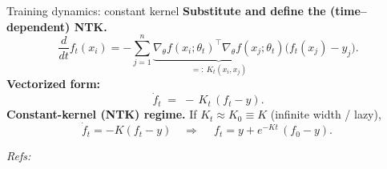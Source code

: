 \documentclass[10pt,aspectratio=169]{beamer}
\begin{document}
\begin{frame}{Training dynamics: constant kernel}
	\textbf{Substitute and define the (time–dependent) NTK.}
	\[
		\frac{d}{dt} f_t(x_i)
		= -\sum_{j=1}^n \underbrace{\nabla_\theta f(x_i;\theta_t)^{\top}\nabla_\theta f(x_j;\theta_t)}_{=:~K_t(x_i,x_j)}
		\big(f_t(x_j)-y_j\big).
	\]
	\pause
	\textbf{Vectorized form:}
	\[
		\boxed{~\dot f_t \;=\; -\,K_t\,(f_t-y).~}
	\]
	\pause
	\textbf{Constant-kernel (NTK) regime.} If $K_t \approx K_0 \equiv K$ (infinite width / lazy),
	\[
		\dot f_t = -K(f_t-y)
		\quad\Rightarrow\quad
		\boxed{~f_t = y + e^{-Kt}\,(f_0-y).~}
	\]

	\vspace{0.4em}
	\footnotesize \emph{Refs:} \citep{jacot2018ntk,lee2019wide}\normalsize

\end{frame}
\end{document}
